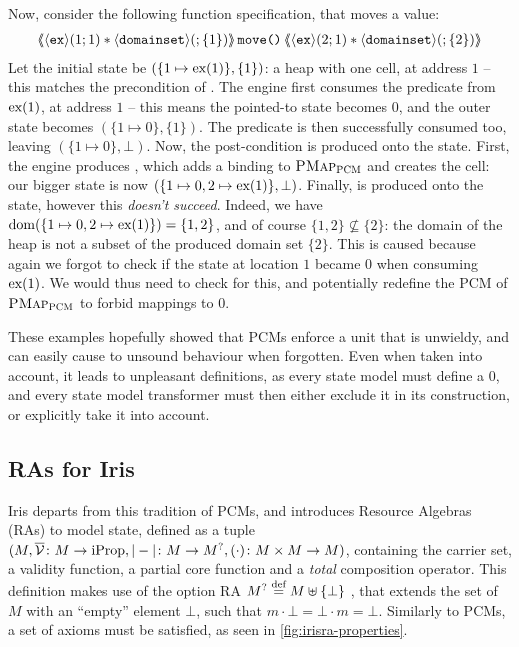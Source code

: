 Now, consider the following function specification, that moves a value:
\begin{align*}
\ESLtriple{\corepred{\exP}{1}{1} * \corepred{\domainset}{}{\{1\}}}{\code{move()}}{\corepred{\exP}{2}{1} * \corepred{\domainset}{}{\{2\}}}
\end{align*}
Let the initial state be $(\{ 1\mapsto \text{ex}(1)\}, \{ 1\} )$: a heap with one cell, at address $1$ -- this matches the precondition of . The engine first consumes the \exP{} predicate from $\text{ex}(1)$, at address $1$ -- this means the pointed-to state becomes $0$, and the outer state becomes $(\{ 1\mapsto 0\}, \{ 1\})$. The \domainset{} predicate is then successfully consumed too, leaving $(\{ 1\mapsto 0\},\bot)$. Now, the post-condition is produced onto the state. First, the engine produces , which adds a binding to $\textsc{PMap}_{\textsc{PCM}}$ and creates the cell: our bigger state is now $(\{ 1\mapsto 0, 2\mapsto \text{ex}(1)\},\bot)$. Finally,  is produced onto the state, however this \emph{doesn't succeed}. Indeed, we have $\operatorname{dom}(\{1\mapsto 0, 2\mapsto \text{ex}(1)\})=\{1,2\}$, and of course $\{1,2\}\not\subseteq \{2\}$: the domain of the heap is not a subset of the produced domain set $\{2\}$. This is caused because again we forgot to check if the state at location $1$ became $0$ when consuming $\text{ex}(1)$. We would thus need to check for this, and potentially redefine the PCM of $\textsc{PMap}_{\textsc{PCM}}$ to forbid mappings to $0$.

These examples hopefully showed that PCMs enforce a unit that is unwieldy, and can easily cause to unsound behaviour when forgotten. Even when taken into account, it leads to unpleasant definitions, as every state model must define a $0$, and every state model transformer must then either exclude it in its construction, or explicitly take it into account.

\subsection{RAs for Iris}

Iris \cite{iris1,iris2,iris3,iris} departs from this tradition of PCMs, and introduces Resource Algebras (RAs) to model state, defined as a tuple ${(M, \overline{\cal V}\colon M\rightarrow \text{iProp}, |-|\colon M\rightarrow M^?, (\cdot)\colon M\times M\rightarrow M)}$, containing the carrier set, a validity function, a partial core function and a \emph{total} composition operator. This definition makes use of the option RA $M^?\stackrel{\textnormal{def}}= M\uplus\{\bot\}$ \cite{iris-option}, that extends the set of $M$ with an ``empty'' element $\bot$, such that $m\cdot\bot=\bot\cdot m=\bot$. Similarly to PCMs, a set of axioms must be satisfied, as seen in \autoref{fig:irisra-properties}.

